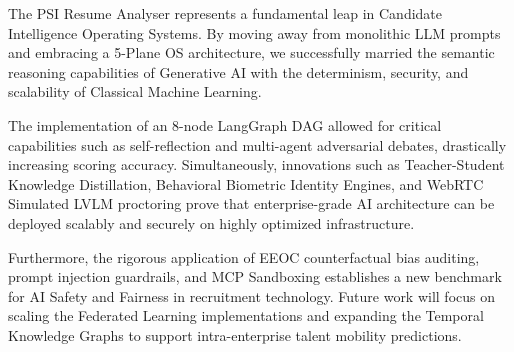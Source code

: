 The PSI Resume Analyser represents a fundamental leap in Candidate Intelligence Operating Systems. By moving away from monolithic LLM prompts and embracing a 5-Plane OS architecture, we successfully married the semantic reasoning capabilities of Generative AI with the determinism, security, and scalability of Classical Machine Learning. 

The implementation of an 8-node LangGraph DAG allowed for critical capabilities such as self-reflection and multi-agent adversarial debates, drastically increasing scoring accuracy. Simultaneously, innovations such as Teacher-Student Knowledge Distillation, Behavioral Biometric Identity Engines, and WebRTC Simulated LVLM proctoring prove that enterprise-grade AI architecture can be deployed scalably and securely on highly optimized infrastructure.

Furthermore, the rigorous application of EEOC counterfactual bias auditing, prompt injection guardrails, and MCP Sandboxing establishes a new benchmark for AI Safety and Fairness in recruitment technology. Future work will focus on scaling the Federated Learning implementations and expanding the Temporal Knowledge Graphs to support intra-enterprise talent mobility predictions.
